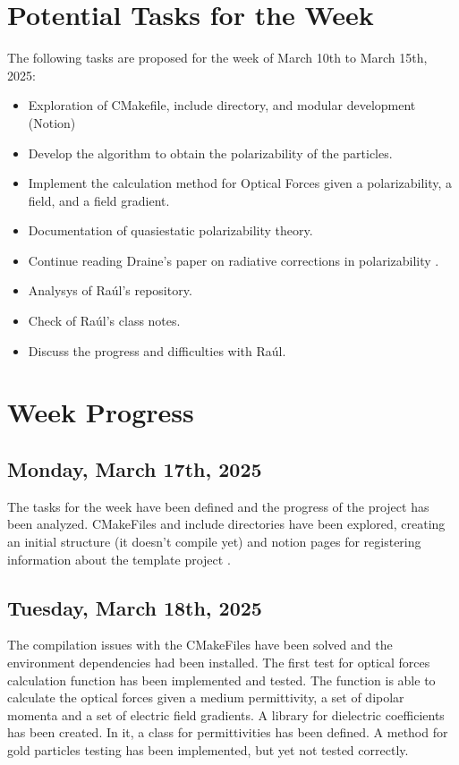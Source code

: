 \documentclass[12pt]{article}
\begin{document}
\section{Potential Tasks for the Week}
The following tasks are proposed for the week of March 10th to March 15th, 2025:
\begin{itemize}
    \item Exploration of CMakefile, include directory, and modular development (Notion) 
    \item Develop the algorithm to obtain the polarizability of the particles.
    \item Implement the calculation method for Optical Forces given a polarizability, a field, and a field gradient.
    \item Documentation of quasiestatic polarizability theory.
    \item Continue reading Draine's paper on radiative corrections in polarizability \cite{Draine1988ApJ...333..848D}.
    \item Analysys of Raúl's  repository.
    \item Check of Raúl's class notes.
    \item Discuss the progress and difficulties with Raúl.
\end{itemize}

\section{Week Progress}

\subsection{Monday, March 17th, 2025}
The tasks for the week have been defined and the progress
of the project has been analyzed. CMakeFiles and include
directories have been explored, creating an initial structure
(it doesn't compile yet) and notion pages for registering
information about the template project .

\subsection{Tuesday, March 18th, 2025}
The compilation issues with the CMakeFiles have been solved
and the environment dependencies had been installed. The
first test for optical forces calculation function has been
implemented and tested. The function is able to calculate
the optical forces given a medium permittivity, a set of
dipolar momenta and a set of electric field gradients.
A library for dielectric coefficients has been created.
In it, a class for permittivities has been defined. A method
for gold particles testing has been implemented, but yet not
tested correctly.
\end{document}
